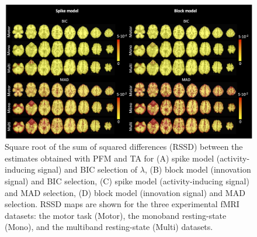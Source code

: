 \begin{figure}[t!]
    \begin{center}
        \includegraphics[width=\textwidth]{figures/rssd_maps.png}
    \end{center}
    \caption{Square root of the sum of squared differences (RSSD) between the estimates obtained with PFM and TA for (A) spike model (activity-inducing signal) and BIC selection of $\lambda$, (B) block model (innovation signal) and BIC selection, (C) spike model (activity-inducing signal) and MAD selection, (D) block model (innovation signal) and MAD selection. RSSD maps are shown for the three experimental fMRI datasets: the motor task (Motor), the monoband resting-state (Mono), and the multiband resting-state (Multi) datasets.}
\label{fig:rss}
\end{figure}

